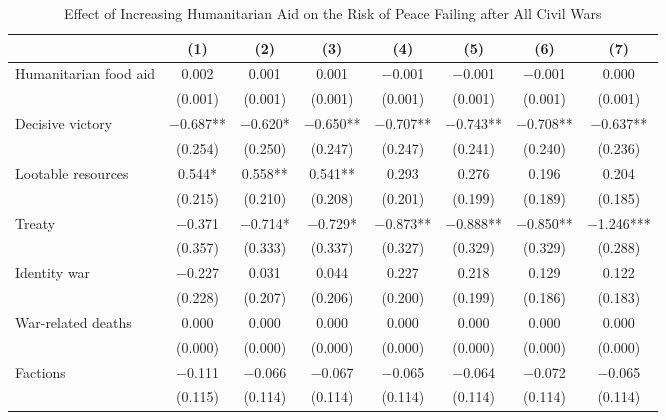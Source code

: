 \begin{table}
\centering\centering
\caption{Effect of Increasing Humanitarian Aid on the Risk of Peace Failing after All Civil Wars \label{a\_peace\_table1}}
\centering
\fontsize{8}{10}\selectfont
\begin{threeparttable}
\begin{tabular}[t]{lccccccc}
\toprule
  & (1) & (2) & (3) & (4) & (5) & (6) & (7)\\
\midrule
Humanitarian food aid & \num{0.002} & \num{0.001} & \num{0.001} & \num{-0.001} & \num{-0.001} & \num{-0.001} & \num{0.000}\\
 & (\num{0.001}) & (\num{0.001}) & (\num{0.001}) & (\num{0.001}) & (\num{0.001}) & (\num{0.001}) & (\num{0.001})\\
Decisive victory & \num{-0.687}** & \num{-0.620}* & \num{-0.650}** & \num{-0.707}** & \num{-0.743}** & \num{-0.708}** & \num{-0.637}**\\
 & (\num{0.254}) & (\num{0.250}) & (\num{0.247}) & (\num{0.247}) & (\num{0.241}) & (\num{0.240}) & (\num{0.236})\\
Lootable resources & \num{0.544}* & \num{0.558}** & \num{0.541}** & \num{0.293} & \num{0.276} & \num{0.196} & \num{0.204}\\
 & (\num{0.215}) & (\num{0.210}) & (\num{0.208}) & (\num{0.201}) & (\num{0.199}) & (\num{0.189}) & (\num{0.185})\\
Treaty & \num{-0.371} & \num{-0.714}* & \num{-0.729}* & \num{-0.873}** & \num{-0.888}** & \num{-0.850}** & \num{-1.246}***\\
 & (\num{0.357}) & (\num{0.333}) & (\num{0.337}) & (\num{0.327}) & (\num{0.329}) & (\num{0.329}) & (\num{0.288})\\
Identity war & \num{-0.227} & \num{0.031} & \num{0.044} & \num{0.227} & \num{0.218} & \num{0.129} & \num{0.122}\\
 & (\num{0.228}) & (\num{0.207}) & (\num{0.206}) & (\num{0.200}) & (\num{0.199}) & (\num{0.186}) & (\num{0.183})\\
War-related deaths & \num{0.000} & \num{0.000} & \num{0.000} & \num{0.000} & \num{0.000} & \num{0.000} & \num{0.000}\\
 & (\num{0.000}) & (\num{0.000}) & (\num{0.000}) & (\num{0.000}) & (\num{0.000}) & (\num{0.000}) & (\num{0.000})\\
Factions & \num{-0.111} & \num{-0.066} & \num{-0.067} & \num{-0.065} & \num{-0.064} & \num{-0.072} & \num{-0.065}\\
 & (\num{0.115}) & (\num{0.114}) & (\num{0.114}) & (\num{0.114}) & (\num{0.114}) & (\num{0.114}) & (\num{0.114})\\

\end{tabular}
\end{threeparttable}
\end{table}
